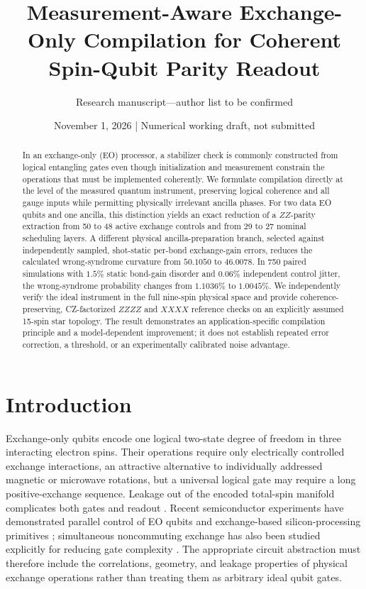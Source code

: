 \documentclass[aps,prx,twocolumn,superscriptaddress,10pt,longbibliography,floatfix]{revtex4-2}
\begin{document}
\title{Measurement-Aware Exchange-Only Compilation for Coherent Spin-Qubit Parity Readout}
\author{Research manuscript---author list to be confirmed}
\date{November 1, 2026 \quad | \quad Numerical working draft, not submitted}
\begin{abstract}
In an exchange-only (EO) processor, a stabilizer check is commonly constructed from logical entangling gates even though initialization and measurement constrain the operations that must be implemented coherently. We formulate compilation directly at the level of the measured quantum instrument, preserving logical coherence and all gauge inputs while permitting physically irrelevant ancilla phases. For two data EO qubits and one ancilla, this distinction yields an exact reduction of a $ZZ$-parity extraction from 50 to 48 active exchange controls and from 29 to 27 nominal scheduling layers. A different physical ancilla-preparation branch, selected against independently sampled, shot-static per-bond exchange-gain errors, reduces the calculated wrong-syndrome curvature from $50.1050$ to $46.0078$. In 750 paired simulations with $1.5\%$ static bond-gain disorder and $0.06\%$ independent control jitter, the wrong-syndrome probability changes from $1.1036\%$ to $1.0045\%$. We independently verify the ideal instrument in the full nine-spin physical space and provide coherence-preserving, CZ-factorized $ZZZZ$ and $XXXX$ reference checks on an explicitly assumed 15-spin star topology. The result demonstrates an application-specific compilation principle and a model-dependent improvement; it does not establish repeated error correction, a threshold, or an experimentally calibrated noise advantage.
\end{abstract}
\maketitle

\section{Introduction}
\label{sec:introduction}
Exchange-only qubits encode one logical two-state degree of freedom in three interacting electron spins. Their operations require only electrically controlled exchange interactions, an attractive alternative to individually addressed magnetic or microwave rotations, but a universal logical gate may require a long positive-exchange sequence. Leakage out of the encoded total-spin manifold complicates both gates and readout \cite{fong2011,hickman2013}. Recent semiconductor experiments have demonstrated parallel control of EO qubits and exchange-based silicon-processing primitives \cite{madzik2025,hrl2026}; simultaneous noncommuting exchange has also been studied explicitly for reducing gate complexity \cite{heinz2025}. The appropriate circuit abstraction must therefore include the correlations, geometry, and leakage properties of physical exchange operations rather than treating them as arbitrary ideal qubit gates.
\end{document}

